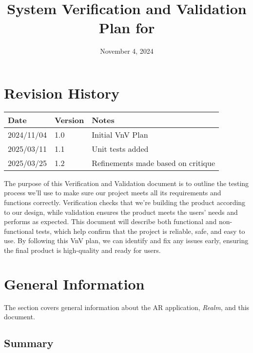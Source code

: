 \documentclass[12pt, titlepage]{article}
\begin{document}
\title{System Verification and Validation Plan for \progname{}}
\author{\authname}
\date{November 4, 2024}

\maketitle


\section*{Revision History}

\begin{tabularx}{\textwidth}{p{3cm}p{2cm}X}
  \toprule {\bf Date} & {\bf Version} & {\bf Notes}      \\
  \midrule
  2024/11/04          & 1.0           & Initial VnV Plan \\
  \midrule
  2025/03/11          & 1.1           & Unit tests added \\
  \midrule
  2025/03/25          & 1.2           & Refinements made based on critique \\
  \bottomrule
\end{tabularx}

\newpage

\tableofcontents

\listoftables

\newpage


The purpose of this Verification and Validation document is to outline the testing process we'll use to make sure our project meets all its requirements and functions correctly. Verification checks that we're building the product according to our design, while validation ensures the product meets the users' needs and performs as expected. This document will describe both functional and non-functional tests, which help confirm that the project is reliable, safe, and easy to use. By following this VnV plan, we can identify and fix any issues early, ensuring the final product is high-quality and ready for users.

\section{General Information}
The section covers general information about the AR application, \textit{Realm}, and this document.

\subsection{Summary}
\end{document}
